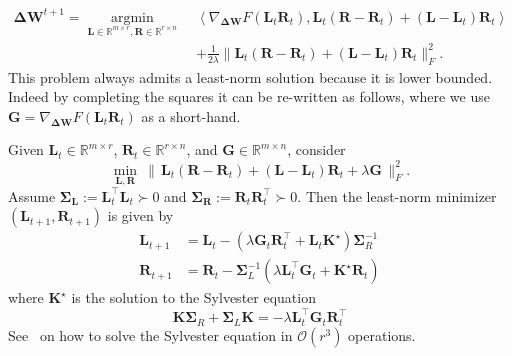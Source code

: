 \documentclass[11pt]{article}
\newcommand{\mat}[1]{\bm{#1}}
\newcommand{\R}{\mathbb{R}}
\newcommand{\mG}{\mat{G}}
\newcommand{\mK}{\mat{K}}
\newcommand{\mL}{\mat{L}}
\newcommand{\mR}{\mat{R}}
\newcommand{\mS}{\mat{\Sigma}}
\newcommand{\DW}{\mat{\Delta W}}
\newcommand{\dotprod}[1]{\left< #1\right>}
\DeclareMathOperator{\argmininn}{argmin}
\newcommand{\argmin}[1]{ \underset{#1}{\argmininn} \;}
\begin{document}
\begin{align}
 \DW^{t+1} =   \argmin{\mL\in \R^{m \times r},\mR \in \R^{r \times n}}  & \dotprod{\nabla_{\DW} F(\mL_t\mR_t), \mL_t(\mR-\mR_t)+(\mL-\mL_t)\mR_t } \nonumber \\
 &  + \frac{1}{2\lambda} \| \mL_t(\mR-\mR_t)+(\mL-\mL_t)\mR_t\|_F^2. \label{eq:linprodGD}
\end{align}
This problem always admits a least-norm solution because it is lower bounded. Indeed by completing the squares it can be re-written as follows, where we use $\mG =\nabla_{\DW} F(\mL_t\mR_t) $ as a short-hand.


\begin{lemma}
Given $\mL_t\in\R^{m\times r}$, $\mR_t\in\R^{r\times n}$, and $\mG\in\R^{m\times n}$, consider
\begin{equation} \label{eq:least-square-lin}
\min_{\mL,\mR}\ \bigl\|\,\mL_t(\mR-\mR_t)+(\mL-\mL_t)\mR_t+\lambda \mG\,\bigr\|_F^2.
\end{equation}
Assume $\mS_{\!\mL}:=\mL_t^\top\mL_t\succ0$ and $\mS_{\!\mR}:=\mR_t\mR_t^\top\succ0$.
Then the least-norm minimizer $(\mL_{t+1}, \mR_{t+1})$ is given by 
\begin{align}
   \mL_{t+1} &=  \mL_t-(\lambda \mG_t \mR_t^\top + \mL_t \mK^\star) \mS_{R}^{-1}\\
 \mR_{t+1} &= \mR_t -\mS_{L}^{-1}(\lambda \mL_t^\top \mG_t + \mK^\star \mR_t) \label{eq:LRsollinearize}
\end{align}
where $\mK^\star$ is the solution to the Sylvester equation
\begin{equation} \label{eq:Sylvester}
\mK \mS_{R} + \mS_{L} \mK = -\lambda \mL_t^\top \mG_t \mR_t^\top
\end{equation}
See~ on how to solve the Sylvester equation in $\mathcal{O}(r^3)$ operations.
\end{lemma}
\end{document}
